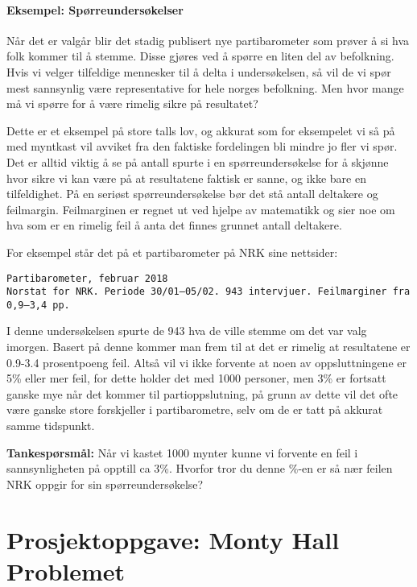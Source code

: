 \documentclass[11pt]{article}
\begin{document}
    \paragraph{Eksempel:
Spørreundersøkelser}\label{eksempel-spuxf8rreundersuxf8kelser}

Når det er valgår blir det stadig publisert nye partibarometer som
prøver å si hva folk kommer til å stemme. Disse gjøres ved å spørre en
liten del av befolkning. Hvis vi velger tilfeldige mennesker til å delta
i undersøkelsen, så vil de vi spør mest sannsynlig være representative
for hele norges befolkning. Men hvor mange må vi spørre for å være
rimelig sikre på resultatet?

Dette er et eksempel på store talls lov, og akkurat som for eksempelet
vi så på med myntkast vil avviket fra den faktiske fordelingen bli
mindre jo fler vi spør. Det er alltid viktig å se på antall spurte i en
spørreundersøkelse for å skjønne hvor sikre vi kan være på at
resultatene faktisk er sanne, og ikke bare en tilfeldighet. På en
seriøst spørreundersøkelse bør det stå antall deltakere og feilmargin.
Feilmarginen er regnet ut ved hjelpe av matematikk og sier noe om hva
som er en rimelig feil å anta det finnes grunnet antall deltakere.

For eksempel står det på et partibarometer på NRK sine nettsider:

\begin{verbatim}
Partibarometer, februar 2018
Norstat for NRK. Periode 30/01–05/02. 943 intervjuer. Feilmarginer fra 0,9–3,4 pp.
\end{verbatim}

I denne undersøkelsen spurte de 943 hva de ville stemme om det var valg
imorgen. Basert på denne kommer man frem til at det er rimelig at
resultatene er 0.9-3.4 prosentpoeng feil. Altså vil vi ikke forvente at
noen av oppsluttningene er 5\% eller mer feil, for dette holder det med
1000 personer, men 3\% er fortsatt ganske mye når det kommer til
partioppslutning, på grunn av dette vil det ofte være ganske store
forskjeller i partibarometre, selv om de er tatt på akkurat samme
tidspunkt.

\textbf{Tankespørsmål:} Når vi kastet 1000 mynter kunne vi forvente en
feil i sannsynligheten på opptill ca 3\%. Hvorfor tror du denne \%-en er
så nær feilen NRK oppgir for sin spørreundersøkelse?

    \section{Prosjektoppgave: Monty Hall
Problemet}\label{prosjektoppgave-monty-hall-problemet}
\end{document}
